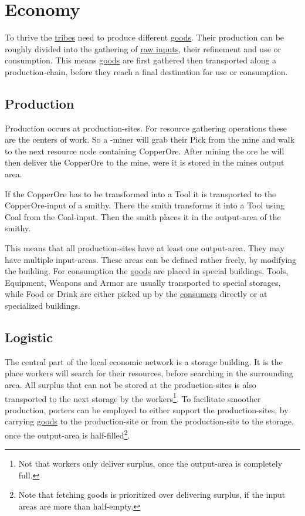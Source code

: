 \chapter{Economy}\label{ch:Economy}

To thrive the \hyperref[ch:Tribes]{tribes} need to produce different
\hyperref[ch:Good]{goods}. Their production can be roughly divided into the
gathering of \hyperref[ch:Goods:Nature]{raw inputs}, their refinement and use
or consumption. This means \hyperref[ch:Goods]{goods} are first gathered then
transported along a production-chain, before they reach a final destination for
use or consumption.

\section{Production}\label{ch:Economy:Production}

Production occurs at production-sites. For resource gathering operations these
are the centers of work. So a -miner will grab their
\gls{Pick} from the mine and walk to the next resource node containing
\gls{CopperOre}. After mining the ore he will then deliver the \gls{CopperOre}
to the mine, were it is stored in the mines output area.

If the \gls{CopperOre} has to be transformed into a \gls{Tool} it is
transported to the \gls{CopperOre}-input of a smithy. There the smith
transforms it into a \gls{Tool} using \gls{Coal} from the \gls{Coal}-input.
Then the smith places it in the output-area of the smithy.

This means that all production-sites have at least one output-area. They may
have multiple input-areas. These areas can be defined rather freely, by
modifying the building. For consumption the \hyperref[ch:Goods]{goods} are
placed in special buildings. \Glspl{Tool}, \gls{Equipment}, \glspl{Weapon} and
\gls{Armor} are usually transported to special storages, while \gls{Food} or
\gls{Drink} are either picked up by the
\hyperref[ch:World:Inhabitants:Sapients]{consumers} directly or at specialized
buildings.

\section{Logistic}\label{ch:Economy:Production}

The central part of the local economic network is a storage building. It is the
place workers will search for their resources, before searching in the
surrounding area. All surplus that can not be stored at the production-sites is
also transported to the next storage by the workers\footnote{ Not that workers
	only deliver surplus, once the output-area is completely full. }. To facilitate
smoother production, porters can be employed to either support the
production-sites, by carrying \hyperref[ch:Goods]{goods} to the production-site
or from the production-site to the storage, once the output-area is
half-filled\footnote{ Note that fetching goods is prioritized over delivering
	surplus, if the input areas are more than half-empty. }.

